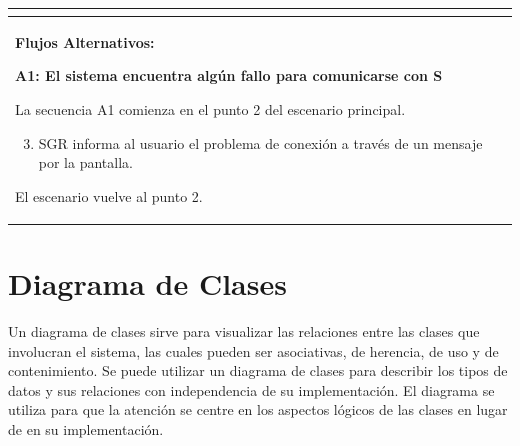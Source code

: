 \begin{longtable}{|l|p{5.5cm}|l|p{2cm}|l|p{1.9cm}|}
{					} \\ \hline

					\multicolumn{6}{|p{15cm}|}{ \textbf{Flujos Alternativos: }
					
					\textbf{A1: El sistema encuentra algún fallo para comunicarse con S}
					
					La secuencia A1 comienza en el punto 2 del escenario principal.
					\begin{enumerate}
							\setcounter{enumi}{2}
							\item SGR informa al usuario el problema de conexión a través de un mensaje por la pantalla.
					\end{enumerate}

					El escenario vuelve al punto 2.

					} \\ \hline

			\end{longtable}
	
	
	\section{Diagrama de Clases}
		Un diagrama de clases sirve para visualizar las relaciones entre las clases que involucran el sistema, las cuales pueden ser asociativas, de herencia, de uso y de contenimiento. Se puede utilizar un diagrama de clases para describir los tipos de datos y sus relaciones con independencia de su implementación. El diagrama se utiliza para que la atención se centre en los aspectos lógicos de las clases en lugar de en su implementación.


